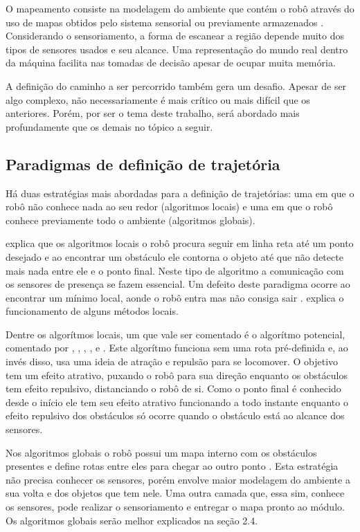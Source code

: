 O mapeamento consiste na modelagem do ambiente que contém o robô através do uso de mapas obtidos pelo sistema sensorial ou previamente armazenados \cite{Souza2008}. Considerando o sensoriamento, a forma de escanear a região depende muito dos tipos de sensores usados e seu alcance. Uma representação do mundo real dentro da máquina facilita nas tomadas de decisão apesar de ocupar muita memória.

A definição do caminho a ser percorrido também gera um desafio. Apesar de ser algo complexo, não necessariamente é mais crítico ou mais difícil que os anteriores. Porém, por ser o tema deste trabalho, será abordado mais profundamente que os demais no tópico a seguir.

\subsection{Paradigmas de definição de trajetória}

Há duas estratégias mais abordadas para a definição de trajetórias: uma em que o robô não conhece nada ao seu redor (algoritmos locais) e uma em que o robô conhece previamente todo o ambiente (algoritmos globais).

\cite{Guzman2008} explica que os algoritmos locais o robô procura seguir em linha reta até um ponto desejado e ao encontrar um obstáculo ele contorna o objeto até que não detecte mais nada entre ele e o ponto final. Neste tipo de algoritmo a comunicação com os sensores de presença se fazem essencial. Um defeito deste paradigma ocorre ao encontrar um mínimo local, aonde o robô entra mas não consiga sair \cite{Souza2008}. \cite{Secchi2008} explica o funcionamento de alguns métodos locais. 

Dentre os algorítmos locais, um que vale ser comentado é o algorítmo potencial, comentado por \cite{Secchi2008}, \cite{Souza2008}, \cite{Guzman2008}, \cite{Choset2005}, \cite{Siegwart2004} e \cite{Thomsen2010}. Este algorítmo funciona sem uma rota pré-definida e, ao invés disso, usa uma ideia de atração e repulsão para se locomover. O objetivo tem um efeito atrativo, puxando o robô para sua direção enquanto os obstáculos tem efeito repulsivo, distanciando o robô de si. Como o ponto final é conhecido desde o início ele tem seu efeito atrativo funcionando a todo instante enquanto o efeito repulsivo dos obstáculos só ocorre quando o obstáculo está ao alcance dos sensores.

Nos algoritmos globais o robô possui um mapa interno com os obstáculos presentes e define rotas entre eles para chegar ao outro ponto \cite{Guzman2008} \cite{Souza2008}. Esta estratégia não precisa conhecer os sensores, porém envolve maior modelagem do ambiente a sua volta e dos objetos que tem nele. Uma outra camada que, essa sim, conhece os sensores, pode realizar o sensoriamento e entregar o mapa pronto ao módulo. Os algoritmos globais serão melhor explicados na seção 2.4.

